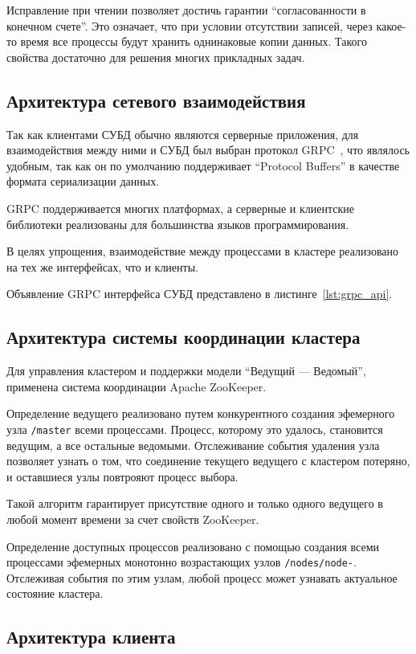 \documentclass[14pt, russian]{scrartcl}
\begin{document}
Исправление при чтении позволяет достичь гарантии ``согласованности в конечном
счете''. Это означает, что при условии отсутствии записей, через какое-то время
все процессы будут хранить однинаковые копии данных. Такого свойства достаточно
для решения многих прикладных задач.

\subsection{Архитектура сетевого взаимодействия}

Так как клиентами СУБД обычно являются серверные приложения, для взаимодействия
между ними и СУБД был выбран протокол GRPC~\cite{grpc}, что являлось удобным,
так как он по умолчанию поддерживает ``Protocol Buffers'' в качестве формата
сериализации данных.

GRPC поддерживается многих платформах, а серверные и клиентские библиотеки
реализованы для большинства языков программирования.

В целях упрощения, взаимодействие между процессами в кластере реализовано на тех
же интерфейсах, что и клиенты.

Объявление GRPC интерфейса СУБД представлено в листинге~\ref{lst:grpc_api}.

\subsection{Архитектура системы координации кластера}

Для управления кластером и поддержки модели ``Ведущий --- Ведомый'', применена
система координации Apache ZooKeeper.

Определение ведущего реализовано путем конкурентного создания эфемерного узла
\verb|/master| всеми процессами. Процесс, которому это удалось, становится
ведущим, а все остальные ведомыми. Отслеживание события удаления узла позволяет
узнать о том, что соединение текущего ведущего с кластером потеряно, и
оставшиеся узлы повтрояют процесс выбора.

Такой алгоритм гарантирует присутствие одного и только одного ведущего в любой
момент времени за счет свойств ZooKeeper.

Определение доступных процессов реализовано с помощью создания всеми процессами
эфемерных монотонно возрастающих узлов \verb|/nodes/node-|. Отслеживая события
по этим узлам, любой процесс может узнавать актуальное состояние кластера.

\subsection{Архитектура клиента}
\end{document}

